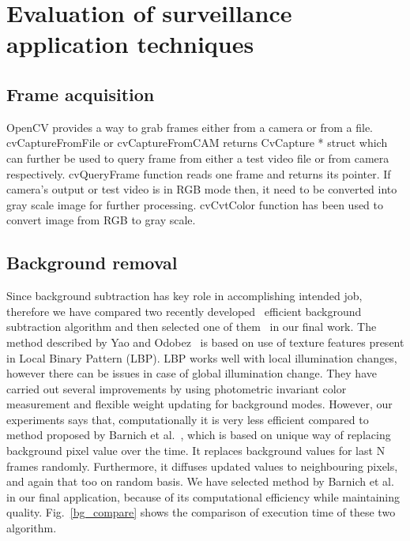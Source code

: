 \section {Evaluation of surveillance application techniques}
\subsection{Frame acquisition}
\indent OpenCV provides a way to grab frames either from a camera or
from a file. cvCaptureFromFile or cvCaptureFromCAM returns CvCapture *
struct which can further be used to query frame from either a test video
file or from camera respectively. cvQueryFrame function reads one frame
and returns its pointer. If camera's output or test video is in RGB mode
then, it need to be converted into gray scale image for further
processing. cvCvtColor function has been used to convert image from RGB
to gray scale.
\subsection{Background removal}
\indent Since background subtraction has key role in accomplishing
intended job, therefore we have compared two recently developed~\cite{3,
5} efficient background subtraction algorithm and then selected one of
them~\cite{5} in our final work.  The method described by Yao and
Odobez~\cite{3} is based on use of texture features present in Local
Binary Pattern (LBP).  LBP works well with local illumination changes,
however there can be issues in case of global illumination change. They
have carried out several improvements by using photometric invariant
color measurement and flexible weight updating for background
modes. However, our experiments says that, computationally it is very
less efficient compared to method proposed by Barnich et al.~\cite{9},
which is based on unique way of replacing background pixel value over
the time. It replaces background values for last N frames randomly.
Furthermore, it diffuses updated values to neighbouring pixels, and
again that too on random basis. We have selected method by Barnich et
al.~\cite{9} in our final application, because of its computational
efficiency while maintaining quality.  Fig.~\ref{bg_compare} shows the
comparison of execution time of these two algorithm.

